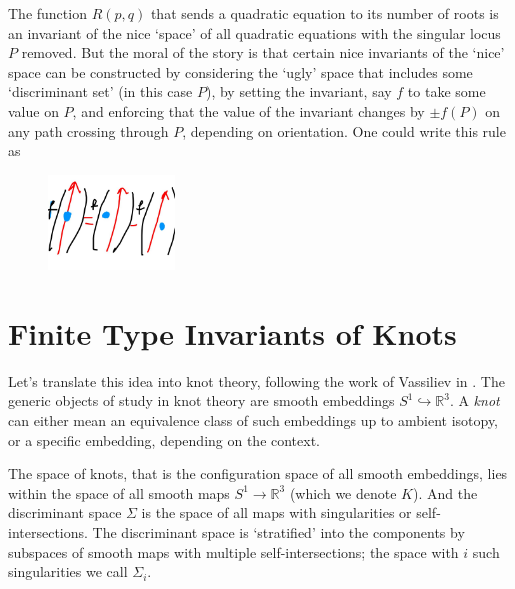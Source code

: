\documentclass[12pt]{report}
\newcommand{\R}{\mathbb{R}}
\theoremstyle{regular}
\begin{document}
        The function \(R(p, q)\) that sends a quadratic equation to its number of roots is an invariant of the nice `space' of all quadratic equations with the singular locus \(P\) removed. But the moral of the story is that certain nice invariants of the `nice' space can be constructed by considering the `ugly' space that includes some `discriminant set' (in this case \(P\)), by setting the invariant, say \(f\) to take some value on \(P\), and enforcing that the value of the invariant changes by \(\pm f(P)\) on any path crossing through \(P\), depending on orientation. One could write this rule as

        \begin{figure}[H]
                \centering
                \includegraphics[width=0.3\textwidth]{graphics/simple_singularity_relation.jpg}
        \end{figure}

        \section*{Finite Type Invariants of Knots}

        Let's translate this idea into knot theory, following the work of Vassiliev in \cite{cohomology-of-knot-spaces, complements-of-discriminants-of-smooth-maps-topology-and-applications}. The generic objects of study in knot theory are smooth embeddings \(S^{1} \hookrightarrow \R^{3}\). A \textit{knot} can either mean an equivalence class of such embeddings up to ambient isotopy, or a specific embedding, depending on the context.

        The space of knots, that is the configuration space of all smooth embeddings, lies within the space of all smooth maps \(S^{1} \to \R^{3}\) (which we denote \(K\)). And the discriminant space \(\Sigma\) is the space of all maps with singularities or self-intersections. The discriminant space is `stratified' into the components by subspaces of smooth maps with multiple self-intersections; the space with \(i\) such singularities we call \(\Sigma_{i}\).
\end{document}
